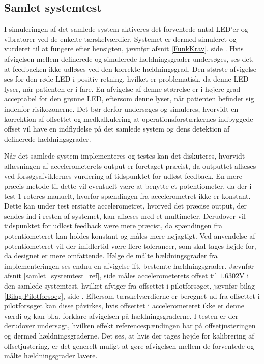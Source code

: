 \subsection{Samlet systemtest}
I simuleringen af det samlede system aktiveres det forventede antal LED'er og vibratorer ved de enkelte tærskelværdier. Systemet er dermed simuleret og vurderet til at fungere efter hensigten, jævnfør afsnit \ref{FunkKrav}, side \pageref{FunkKrav}. Hvis afvigelsen mellem definerede og simulerede hældningsgrader undersøges, ses det, at feedbacken ikke udløses ved den korrekte hældningsgrad. Den største afvigelse ses for den røde LED i positiv retning, hvilket er problematisk, da denne LED lyser, når patienten er i fare. En afvigelse af denne størrelse er i højere grad acceptabel for den grønne LED, eftersom denne lyser, når patienten befinder sig indenfor risikozonerne. Det bør derfor undersøges og simuleres, hvorvidt en korrektion af offsettet og medkalkulering at operationsforstærkernes indbyggede offset vil have en indflydelse på det samlede system og dens detektion af definerede hældningsgrader. 

Når det samlede system implementeres og testes kan det diskuteres, hvorvidt aflæsningen af accelerometerets output er foretaget præcist, da outputtet aflæses ved forsøgsafviklernes vurdering af tidspunktet for udløst feedback. En mere præcis metode til dette vil eventuelt være at benytte et potentiometer, da der i test $1$ roteres manuelt, hvorfor spændingen fra accelerometret ikke er konstant. Dette kan under test erstatte accelerometret, hvorved det præcise output, der sendes ind i resten af systemet, kan aflæses med et multimeter. Derudover vil tidspunktet for udløst feedback være mere præcist, da spændingen fra potentiometeret kan holdes konstant og måles mere nøjagtigt. Ved anvendelse af potentiometeret vil der imidlertid være flere tolerancer, som skal tages højde for, da designet er mere omfattende. Ifølge de målte hældningsgrader fra implementeringen ses endnu en afvigelse ift. bestemte hældningsgrader. Jævnfør afsnit \ref{samlet_systemtest_ref}, side \pageref{samlet_systemtest_ref} måles accelerometerets offset til $1.6302$V i den samlede systemtest, hvilket afviger fra offsettet i pilotforsøget, jævnfør bilag \ref{Bilag:Pilotforsoeg}, side \pageref{Bilag:Pilotforsoeg}. Eftersom tærskelværdierne er beregnet ud fra offsettet i pilotforsøget kan disse påvirkes, hvis offsettet i accelerometeret ikke er denne værdi og kan bl.a. forklare afvigelsen på hældningsgraderne. %
I testen er der derudover undersøgt, hvilken effekt referencespændingen har på offsetjusteringen og dermed hældningsgraderne. Det ses, at hvis der tages højde for kalibrering af offsetjustering, er det generelt muligt at gøre afvigelsen mellem de forventede og målte hældningsgrader lavere. 

